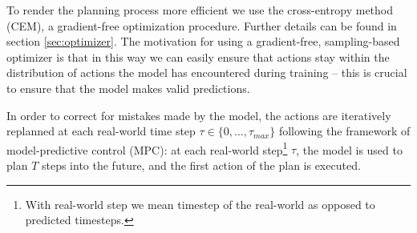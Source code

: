 To render the planning process more efficient we use the cross-entropy method (CEM), a gradient-free optimization procedure. Further details can be found in section \ref{sec:optimizer}. The motivation for using a gradient-free, sampling-based optimizer is that in this way we can easily ensure that actions stay within the distribution of actions the model has encountered during training -- this is crucial to ensure that the model makes valid predictions.

In order to correct for mistakes made by the model, the actions are iteratively replanned at each real-world time step $\tau \in \{0,...,\tau_{max}\}$ following the framework of model-predictive control (MPC): at each real-world step\footnote{With real-world step we mean timestep of the real-world as opposed to predicted timesteps.} $\tau$, the model is used to plan $T$ steps into the future, and the first action of the plan is executed.









